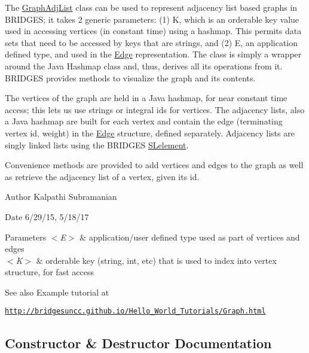 The \mbox{\hyperlink{class_bridges_1_1_graph_adj_list_1_1_graph_adj_list}{Graph\+Adj\+List}} class can be used to represent adjacency list based graphs in B\+R\+I\+D\+G\+ES; it takes 2 generic parameters\+: (1) K, which is an orderable key value used in accessing vertices (in constant time) using a hashmap. This permits data sets that need to be accessed by keys that are strings, and (2) E, an application defined type, and used in the \mbox{\hyperlink{namespace_bridges_1_1_edge}{Edge}} representation. The class is simply a wrapper around the Java Hashmap class and, thus, derives all its operations from it. B\+R\+I\+D\+G\+ES provides methods to visualize the graph and its contents.

The vertices of the graph are held in a Java hashmap, for near constant time access; this lets us use strings or integral ids for vertices. The adjacency lists, also a Java hashmap are built for each vertex and contain the edge (terminating vertex id, weight) in the \mbox{\hyperlink{namespace_bridges_1_1_edge}{Edge}} structure, defined separately. Adjacency lists are singly linked lists using the B\+R\+I\+D\+G\+ES \mbox{\hyperlink{namespace_bridges_1_1_s_lelement}{S\+Lelement}}.

Convenience methods are provided to add vertices and edges to the graph as well as retrieve the adjacency list of a vertex, given its id.

\begin{DoxyAuthor}{Author}
Kalpathi Subramanian
\end{DoxyAuthor}
\begin{DoxyDate}{Date}
6/29/15, 5/18/17
\end{DoxyDate}

\begin{DoxyParams}{Parameters}
{\em $<$\+E$>$} & application/user defined type used as part of vertices and edges \\
\hline
{\em $<$\+K$>$} & orderable key (string, int, etc) that is used to index into vertex structure, for fast access\\
\hline
\end{DoxyParams}
\begin{DoxySeeAlso}{See also}
Example tutorial at 
\end{DoxySeeAlso}
\href{http://bridgesuncc.github.io/Hello_World_Tutorials/Graph.html}{\tt http\+://bridgesuncc.\+github.\+io/\+Hello\+\_\+\+World\+\_\+\+Tutorials/\+Graph.\+html} 

\subsection{Constructor \& Destructor Documentation}
\mbox{\label{class_bridges_1_1_graph_adj_list_1_1_graph_adj_list_ad87576232d34f60705dc8fc15028ccc9}} 
